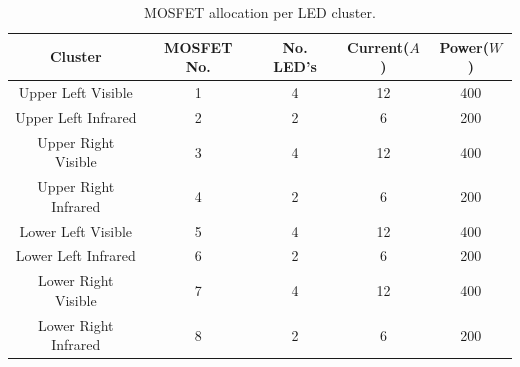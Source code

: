 \documentclass[fleqn,twoside]{article}
\begin{document}
\begin{table}
	\centering
	\caption{MOSFET allocation per LED cluster.}
	\label{tab:mosfets}
	\begin{tabular}{ccccc}
		\toprule
		Cluster & MOSFET No. & No. LED's & Current($A$) & Power($W$)  \\ 
		\midrule
		Upper Left Visible   	& 1 & 4 & 12 & 400   \\[6pt] 
		Upper Left Infrared		& 2 & 2 & 6  & 200   \\[6pt] 
		Upper Right Visible   	& 3 & 4 & 12 & 400   \\[6pt] 
		Upper Right Infrared	& 4 & 2 & 6  & 200   \\[6pt] 
		Lower Left Visible   	& 5 & 4 & 12 & 400   \\[6pt] 
		Lower Left Infrared		& 6 & 2 & 6  & 200   \\[6pt] 
		Lower Right Visible   	& 7 & 4 & 12 & 400   \\[6pt] 
		Lower Right Infrared	& 8 & 2 & 6  & 200   \\[6pt] 
		\bottomrule
	\end{tabular}
\end{table}
\end{document}
